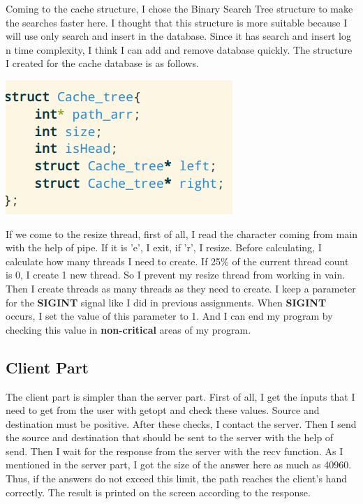 \documentclass{article}
\begin{document}
Coming to the cache structure, I chose the Binary Search Tree structure to make the searches faster here. I thought that this structure is more suitable because I will use only search and insert in the database. Since it has search and insert {log n} time complexity, I think I can add and remove database quickly. The structure I created for the cache database is as follows.
\begin{center}
    \centering
    \includegraphics[scale=0.5]{cachetree.png}
    
    \label{fig:myGraph}
\end{center}
If we come to the resize thread, first of all, I read the character coming from main with the help of pipe. If it is 'e', I exit, if 'r', I resize. Before calculating, I calculate how many threads I need to create. If 25\% of the current thread count is 0, I create 1 new thread. So I prevent my resize thread from working in vain. Then I create threads as many threads as they need to create.
\newline
I keep a parameter for the \textbf{SIGINT} signal like I did in previous assignments. When \textbf{SIGINT} occurs, I set the value of this parameter to 1. And I can end my program by checking this value in \textbf{non-critical} areas of my program.

\subsection{Client Part}
The client part is simpler than the server part. First of all, I get the inputs that I need to get from the user with getopt and check these values. Source and destination must be positive. After these checks, I contact the server. Then I send the source and destination that should be sent to the server with the help of send. Then I wait for the response from the server with the recv function. As I mentioned in the server part, I got the size of the answer here as much as 40960. Thus, if the answers do not exceed this limit, the path reaches the client's hand correctly. The result is printed on the screen according to the response.
\end{document}
